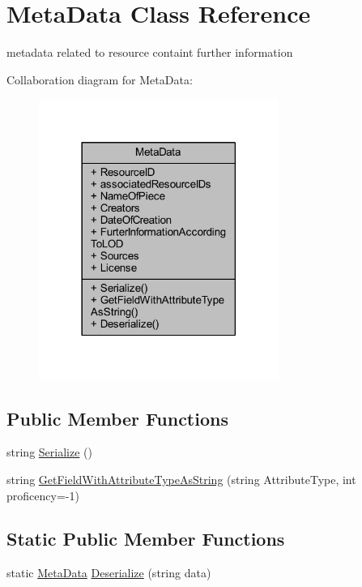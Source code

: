 \hypertarget{class_meta_data}{}\section{Meta\+Data Class Reference}
\label{class_meta_data}


metadata related to resource containt further information  




Collaboration diagram for Meta\+Data\+:
\nopagebreak
\begin{figure}[H]
\begin{center}
\leavevmode
\includegraphics[width=222pt]{class_meta_data__coll__graph}
\end{center}
\end{figure}
\subsection*{Public Member Functions}
\begin{DoxyCompactItemize}
\item 
string \mbox{\hyperlink{class_meta_data_ad61836ec0caf65061ecdcd16c0ee6109}{Serialize}} ()
\item 
string \mbox{\hyperlink{class_meta_data_a6060e6297723e54b0df6c20defb57297}{Get\+Field\+With\+Attribute\+Type\+As\+String}} (string Attribute\+Type, int proficency=-\/1)
\end{DoxyCompactItemize}
\subsection*{Static Public Member Functions}
\begin{DoxyCompactItemize}
\item 
static \mbox{\hyperlink{class_meta_data}{Meta\+Data}} \mbox{\hyperlink{class_meta_data_adcfb4cc074566933e35c3f14451960ed}{Deserialize}} (string data)
\end{DoxyCompactItemize}
